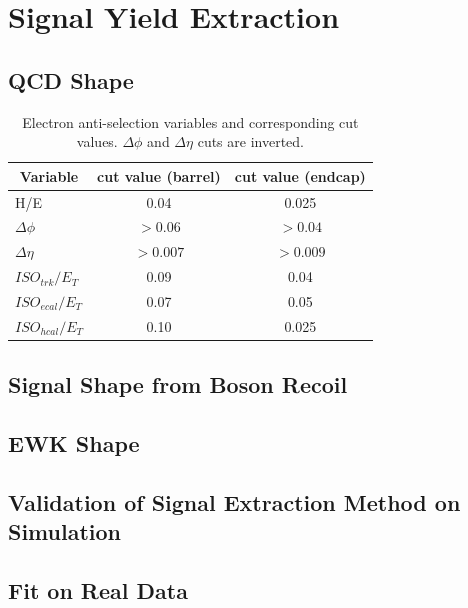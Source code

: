 \section{Signal Yield Extraction}



\subsection{QCD \ETm Shape}
\begin{table}[htbp]
  \begin{center}
    \leavevmode
    \begin{tabular}{lcc} 
      \multicolumn{1}{c}{Variable} & \multicolumn{1}{c}{cut value (barrel)}& \multicolumn{1}{c}{cut value (endcap)}\\\hline
        H/E & 0.04 & 0.025 \\
        $\Delta\phi$ & $>0.06$  & $>0.04$ \\
        $\Delta\eta$ & $>0.007$ & $>0.009$\\
  $ISO_{trk} / E_T $ & 0.09 & 0.04 \\
  $ISO_{ecal}/ E_T$  & 0.07 & 0.05 \\
  $ISO_{hcal}/ E_T$  & 0.10 & 0.025\\
    \end{tabular}
    \caption{Electron anti-selection variables and corresponding cut values. $\Delta\phi$ and $\Delta\eta$ cuts are inverted.}
    \label{asym840:AScuts}
  \end{center}
\end{table}

\subsection{Signal \ETm Shape from Boson Recoil}
\subsection{EWK \ETm Shape}
\subsection{Validation of Signal Extraction Method on Simulation}
\subsection{Fit on Real Data}

